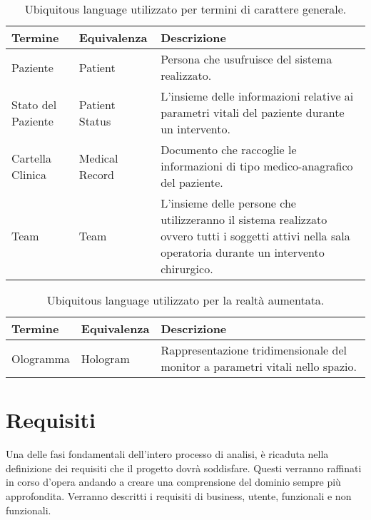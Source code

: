 \bgroup
\def\arraystretch{1.5}
\begin{table}[H]
    \begin{tabular}{ |m{2.5cm}|m{2.5cm}|m{7cm}| } 
        \hline
        \textbf{Termine} & \textbf{Equivalenza} & \textbf{Descrizione}
        \\\hline
        Paziente & Patient & Persona che usufruisce del sistema realizzato.
        \\\hline
        Stato del Paziente & Patient Status & L'insieme delle informazioni relative ai parametri vitali del paziente durante un intervento.
        \\\hline
        Cartella Clinica & Medical Record & Documento che raccoglie le informazioni di tipo medico-anagrafico del paziente. 
        \\\hline
        Team & Team & L'insieme delle persone che utilizzeranno il sistema realizzato ovvero tutti i soggetti attivi nella sala operatoria durante un intervento chirurgico.
        \\\hline
    \end{tabular}
    \caption{\label{tab:general-ubiquitous-language-table}Ubiquitous language utilizzato per termini di carattere generale.}
\end{table}
\egroup

\bgroup
\def\arraystretch{1.5}
\begin{table}[H]
    \begin{tabular}{ |m{2.5cm}|m{2.5cm}|m{7cm}|} 
        \hline
        \textbf{Termine} & \textbf{Equivalenza} & \textbf{Descrizione}
        \\\hline
        Ologramma & Hologram  & Rappresentazione tridimensionale del monitor a parametri vitali nello spazio.
        \\\hline
    \end{tabular}
    \caption{\label{tab:mixed-reality-ubiquitous-language-table}Ubiquitous language utilizzato per la realtà aumentata.}
\end{table}
\egroup


\section{Requisiti}
Una delle fasi fondamentali dell’intero processo di analisi, è ricaduta nella definizione dei requisiti che il progetto dovrà soddisfare. Questi verranno raffinati in corso d’opera andando a creare una comprensione del dominio sempre più approfondita. Verranno descritti i requisiti di business, utente, funzionali e non funzionali.

